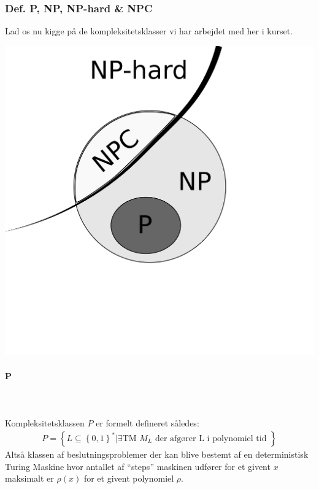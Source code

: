 \subsubsection{Def. P, NP, NP-hard \& NPC}

Lad os nu kigge på de kompleksitetsklasser vi har arbejdet med her i
kurset.
\begin{center}
 \includegraphics[bb=0 0 400 400,scale=0.3]{./PNPNPC.png}
\end{center}


\paragraph{P}
~\\
~\\
Kompleksitetsklassen $P$ er formelt defineret således:
\begin{align*}
 P = \left\lbrace L \subseteq \left\lbrace 0,1 \right\rbrace^* | \exists \text{
TM } M_L \text{ der afgører L i polynomiel tid } \right\rbrace
\end{align*}
Altså klassen af beslutningsproblemer der kan blive bestemt af en
deterministisk Turing Maskine hvor antallet af ``steps'' maskinen
udfører for
et givent $x$ maksimalt er $\rho(x)$ for et givent polynomiel $\rho$.\\
 
